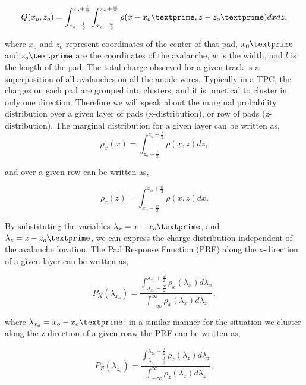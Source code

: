 \begin{equation}
Q(x_o,z_o) = \int_{z_o - \frac{l}{2}}^{z_o + \frac{l}{2}} \int_{x_o - \frac{w}{2}}^{x_o + \frac{w}{2}} \rho(x-x_o\textprime,z - z_o\textprime) dxdz,
\label{eq:prfpadCharge}
\end{equation}

where $x_o$ and $z_o$ represent coordinates of the center of that pad, $x_0\textprime$ and $z_o\textprime$ are the coordinates of the avalanche, $w$ is the width, and $l$ is the length of the pad. The total charge observed for a given track is a superposition of all avalanches on all the anode wires. Typically in a TPC, the charges on each pad are grouped into clusters, and it is practical to cluster in only one direction. Therefore we will speak about the marginal probability distribution over a given layer of pads (x-distribution), or row of pads (z-distribution). The marginal distribution for a given layer can be written as,
\begin{equation}
\rho_x(x) = \int_{z_o - \frac{l}{2}}^{z_o + \frac{l}{2}} \rho(x,z)dz,
\end{equation}

and over a given row can be written as,

\begin{equation}
\rho_z(z) = \int_{x_o - \frac{w}{2}}^{x_o + \frac{w}{2}} \rho(x,z)dx.
\end{equation}

By substituting the variables  $\lambda_x = x - x_o\textprime$, and $\lambda_z = z - z_o\textprime$, we can express the charge distribution independent of the avalanche location. The Pad Response Function (PRF) along the x-direction of a given layer can be written as,

\begin{equation}
P_X(\lambda_{x_o}) = \frac{ \int_{\lambda_{x_o}-\frac{w}{2}}^{\lambda_{x_o} + \frac{w}{2}} \rho_x(\lambda_x)d\lambda_x } {\int_{-\infty}^\infty \rho_x(\lambda_x)d\lambda_x     },
\label{eq:prflayer}
\end{equation}

where $\lambda_{x_o} = x_o - x_o\textprime$; in a similar manner for the situation we cluster along the z-direction  of a given roaw the PRF can be written as,

\begin{equation}
P_Z(\lambda_{z_o}) = \frac{ \int_{\lambda_{z_o}-\frac{l}{2}}^{\lambda_{z_o} + \frac{l}{2}} \rho_z(\lambda_z)d\lambda_z }{\int_{-\infty}^\infty \rho_z(\lambda_z)d\lambda_z  },
\label{eq:prfrow}
\end{equation}

